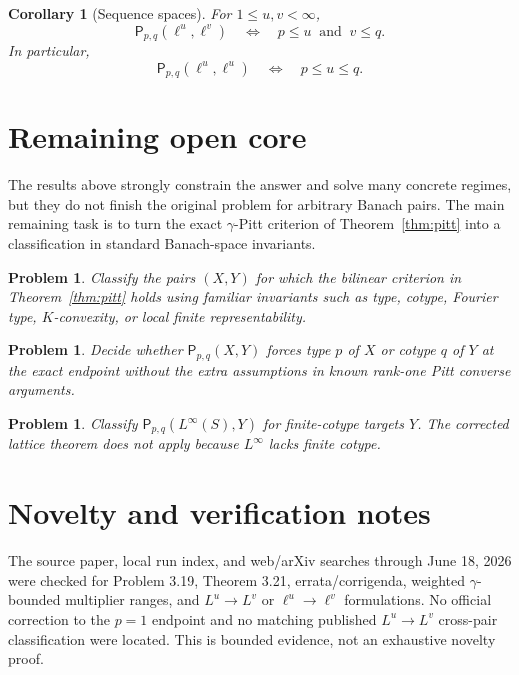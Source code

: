 \documentclass[11pt]{article}
\newtheorem{corollary}[theorem]{Corollary}
\newtheorem{problem}[theorem]{Problem}
\newcommand{\Pprop}{\mathsf P}
\newcommand{\gam}{\gamma}
\begin{document}
\begin{corollary}[Sequence spaces]\label{cor:sequence}
For \(1\le u,v<\infty\),
\[
  \Pprop_{p,q}(\ell^u,\ell^v)
  \quad\Longleftrightarrow\quad
  p\le u\ \text{ and }\ v\le q.
\]
In particular,
\[
  \Pprop_{p,q}(\ell^u,\ell^u)
  \quad\Longleftrightarrow\quad
  p\le u\le q.
\]
\end{corollary}

\section{Remaining open core}

The results above strongly constrain the answer and solve many concrete
regimes, but they do not finish the original problem for arbitrary Banach
pairs.  The main remaining task is to turn the exact
\(\gam\)-Pitt criterion of Theorem~\ref{thm:pitt} into a classification in
standard Banach-space invariants.

\begin{problem}
Classify the pairs \((X,Y)\) for which the bilinear criterion in
Theorem~\ref{thm:pitt} holds using familiar invariants such as type, cotype,
Fourier type, \(K\)-convexity, or local finite representability.
\end{problem}

\begin{problem}
Decide whether \(\Pprop_{p,q}(X,Y)\) forces type \(p\) of \(X\) or cotype
\(q\) of \(Y\) at the exact endpoint without the extra assumptions in known
rank-one Pitt converse arguments.
\end{problem}

\begin{problem}
Classify \(\Pprop_{p,q}(L^\infty(S),Y)\) for finite-cotype targets \(Y\).  The
corrected lattice theorem does not apply because \(L^\infty\) lacks finite
cotype.
\end{problem}

\section{Novelty and verification notes}

The source paper, local run index, and web/arXiv searches through June 18, 2026
were checked for Problem 3.19, Theorem 3.21, errata/corrigenda, weighted
\(\gam\)-bounded multiplier ranges, and \(L^u\to L^v\) or
\(\ell^u\to\ell^v\) formulations.  No official correction to the \(p=1\)
endpoint and no matching published \(L^u\to L^v\) cross-pair classification
were located.  This is bounded evidence, not an exhaustive novelty proof.
\end{document}
